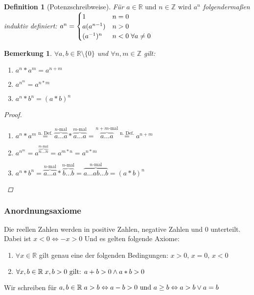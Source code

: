 \documentclass[a4paper,titlepage,oneside]{article}
\def\Z{\ensuremath{\mathbb{Z}} }
\def\R{\ensuremath{\mathbb{R}} }
\def\fa{\ensuremath{\forall}}
\def\lor{\ensuremath{\vee}}
\def\land{\ensuremath{\wedge}}
\def\sp{\hspace{0,1cm}}
\theoremstyle{thmstyle}
\newtheorem{defi}[satz]{Definition}
\newtheorem{bem}[satz]{Bemerkung}
\begin{document}
\begin{defi}[Potenzschreibweise]
Für \(a \in \R \text{ und }n \in \Z \text{ wird }a^n\) folgendermaßen induktiv definiert:
$a^n = \begin{cases} 1 			& n = 0\\
				a(a^{n-1}) 	& n > 0\\
				(a^{-1})^n 	& n < 0 \sp \forall a \ne 0 \end{cases}$
\end{defi}

\begin{bem}
\(\fa a, b \in \R \setminus \{0\} \) und \( \fa n, m \in \Z\) gilt:
\begin{multicols}{3}
\begin{enumerate}[label=(\arabic*)]
	\item $\displaystyle a^n * a^m = a^{n+m} $
	\item $\displaystyle a^{n^m} = a^{n * m} $
	\item $\displaystyle a^n * b^n = (a * b)^n $
\end{enumerate}
\end{multicols}
\begin{proof}\sp
\begin{enumerate}[label=(\arabic*)]
	\item $\displaystyle a^n * a^m \overset{\text{n. Def.}}{=} \overbrace{a \dots a}^{n\text{-mal}}*\overbrace{a \dots a}^{m\text{-mal}} = \overbrace{a \dots a}^{n+m\text{-mal}} \overset{\text{n. Def.}}{=} a^{n+m}$
	\item $\displaystyle a^{n^m} = a^{\overbrace{n \dots n}^{m\text{-mal}}} = a^{m * n} = a^{n*m}$
	\item $\displaystyle a^n * b^n = \overbrace{a \dots a}^{n\text{-mal}}*\overbrace{b \dots b}^{n\text{-mal}} = \overbrace{a \dots a b \dots b}^{n\text{-mal}} = (a*b)^{n}$
\end{enumerate}
\end{proof}
\end{bem}

\subsubsection{Anordnungsaxiome}
Die reellen Zahlen werden in positive Zahlen, negative Zahlen und 0 unterteilt. Dabei ist \(x < 0 \Leftrightarrow -x > 0\) Und es gelten folgende Axiome:
\begin{enumerate}[label=(\arabic*)]
	\item \(\fa x \in \R \) gilt genau eine der folgenden Bedingungen: \(x > 0\text{, } x = 0\text{, } x < 0 \)
	\item \(\fa x,b \in \R \sp x,b > 0 \text{ gilt: } a + b > 0 \land a * b > 0\)
\end{enumerate}
Wir schreiben für \(a, b \in \R \sp a > b \Leftrightarrow a - b > 0\text{ und }a \ge b \Leftrightarrow a > b \lor a = b \)
\end{document}
